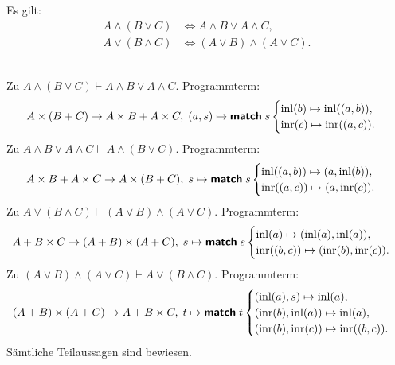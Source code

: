 \begin{Satz}%
\label{bool-dl}
Es gilt:
\begin{align*}
A\land (B\lor C) &\iff A\land B\lor A\land C,\\
A\lor (B\land C) &\iff (A\lor B)\land (A\lor C).
\end{align*}
\end{Satz}
\\
Zu $A\land (B\lor C) \vdash A\land B\lor A\land C$.
Programmterm:
\[A\times (B+C) \to A\times B + A\times C,\; (a, s)\mapsto \text{{\normalfont\sffamily\bfseries match}}\; s \begin{cases}
\operatorname{inl}(b)\mapsto \operatorname{inl}((a,b)),\\
\operatorname{inr}(c)\mapsto \operatorname{inr}((a,c)).
\end{cases}\]
Zu $A\land B\lor A\land C\vdash A\land (B\lor C)$.
Programmterm:
\[A\times B + A\times C\to A\times (B + C),\;
s\mapsto\text{{\normalfont\sffamily\bfseries match}}\; s\begin{cases}
\operatorname{inl}((a,b))\mapsto (a, \operatorname{inl}(b)),\\
\operatorname{inr}((a,c))\mapsto (a, \operatorname{inr}(c)).
\end{cases}
\]
Zu $A\lor (B\land C) \vdash (A\lor B)\land (A\lor C)$. Programmterm:
\[A+B\times C\to (A+B)\times (A+C),\;
s\mapsto\text{{\normalfont\sffamily\bfseries match}}\; s\begin{cases}
\operatorname{inl}(a)\mapsto (\operatorname{inl}(a),\operatorname{inl}(a)),\\
\operatorname{inr}((b,c))\mapsto (\operatorname{inr}(b),\operatorname{inr}(c)).
\end{cases} 
\]
Zu $(A\lor B)\land (A\lor C)\vdash A\lor (B\land C)$. Programmterm:
\[
(A+B)\times (A+C)\to A + B\times C,\;
t\mapsto\text{{\normalfont\sffamily\bfseries match}}\; t\begin{cases}
(\operatorname{inl}(a), s) \mapsto\operatorname{inl}(a),\\
(\operatorname{inr}(b), \operatorname{inl}(a)) \mapsto\operatorname{inl}(a),\\
(\operatorname{inr}(b), \operatorname{inr}(c)) \mapsto\operatorname{inr}((b, c)).
\end{cases}
\]
Sämtliche Teilaussagen sind bewiesen.\;\qedsymbol

